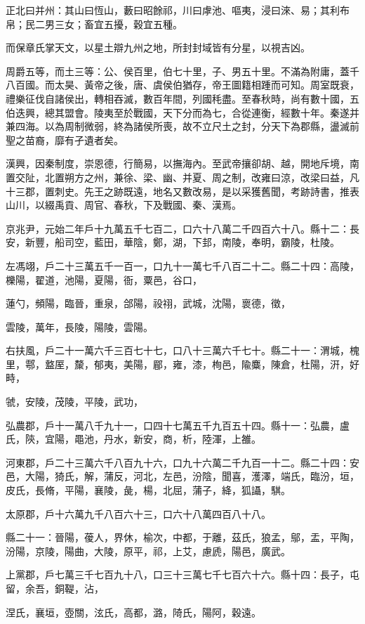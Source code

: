 \begin{pinyinscope}
正北曰并州：其山曰恆山，藪曰昭餘祁，川曰虖池、嘔夷，浸曰淶、易；其利布帛；民二男三女；畜宜五擾，穀宜五種。

而保章氏掌天文，以星土辯九州之地，所封封域皆有分星，以視吉凶。

周爵五等，而土三等：公、侯百里，伯七十里，子、男五十里。不滿為附庸，蓋千八百國。而太昊、黃帝之後，唐、虞侯伯猶存，帝王圖籍相踵而可知。周室既衰，禮樂征伐自諸侯出，轉相吞滅，數百年間，列國秏盡。至春秋時，尚有數十國，五伯迭興，總其盟會。陵夷至於戰國，天下分而為七，合從連衡，經數十年。秦遂并兼四海。以為周制微弱，終為諸侯所喪，故不立尺土之封，分天下為郡縣，盪滅前聖之苗裔，靡有孑遺者矣。

漢興，因秦制度，崇恩德，行簡易，以撫海內。至武帝攘卻胡、越，開地斥境，南置交阯，北置朔方之州，兼徐、梁、幽、并夏、周之制，改雍曰涼，改梁曰益，凡十三郡，置刺史。先王之跡既遠，地名又數改易，是以采獲舊聞，考跡詩書，推表山川，以綴禹貢、周官、春秋，下及戰國、秦、漢焉。

京兆尹，元始二年戶十九萬五千七百二，口六十八萬二千四百六十八。縣十二：長安，新豐，船司空，藍田，華陰，鄭，湖，下邽，南陵，奉明，霸陵，杜陵。

左馮翊，戶二十三萬五千一百一，口九十一萬七千八百二十二。縣二十四：高陵，櫟陽，翟道，池陽，夏陽，衙，粟邑，谷口，

蓮勺，頻陽，臨晉，重泉，郃陽，祋祤，武城，沈陽，褱德，徵，

雲陵，萬年，長陵，陽陵，雲陽。

右扶風，戶二十一萬六千三百七十七，口八十三萬六千七十。縣二十一：渭城，槐里，鄠，盩厔，斄，郁夷，美陽，郿，雍，漆，栒邑，隃麋，陳倉，杜陽，汧，好畤，

虢，安陵，茂陵，平陵，武功，

弘農郡，戶十一萬八千九十一，口四十七萬五千九百五十四。縣十一：弘農，盧氏，陝，宜陽，黽池，丹水，新安，商，析，陸渾，上雒。

河東郡，戶二十三萬六千八百九十六，口九十六萬二千九百一十二。縣二十四：安邑，大陽，猗氏，解，蒲反，河北，左邑，汾陰，聞喜，濩澤，端氏，臨汾，垣，皮氏，長脩，平陽，襄陵，彘，楊，北屈，蒲子，絳，狐讘，騏。

太原郡，戶十六萬九千八百六十三，口六十八萬四百八十八。

縣二十一：晉陽，葰人，界休，榆次，中都，于離，茲氏，狼孟，鄔，盂，平陶，汾陽，京陵，陽曲，大陵，原平，祁，上艾，慮虒，陽邑，廣武。

上黨郡，戶七萬三千七百九十八，口三十三萬七千七百六十六。縣十四：長子，屯留，余吾，銅鞮，沾，

涅氏，襄垣，壺關，泫氏，高都，潞，陭氏，陽阿，穀遠。


\end{pinyinscope}
